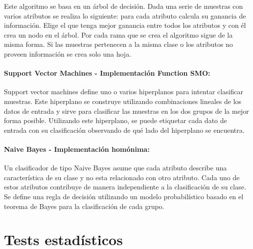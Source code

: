 
Este algoritmo se basa en un árbol de decisión. Dada una serie de muestras con varios atributos se realiza lo siguiente: para cada atributo calcula su ganancia de información. Elige el que tenga mejor ganancia entre todos los atributos y con él crea un nodo en el árbol. Por cada rama que se crea el algoritmo sigue de la misma forma. Si las muestras pertenecen a la misma clase o los atributos no proveen información se crea solo una hoja.

\paragraph{Support Vector Machines \cite{Platt98sequentialminimal} - Implementación Function SMO:}


Support vector machines define uno o varios hiperplanos para intentar clasificar muestras. Este hiperplano se construye utilizando combinaciones lineales de los datos de entrada y sirve para clasificar las muestras en los dos grupos de la mejor forma posible. Utilizando este hiperplano, se puede etiquetar cada dato de entrada con su clasificación observando de qué lado del hiperplano se encuentra.

\paragraph{Naive Bayes \cite{DBLP:conf/flairs/Zhang04} - Implementación homónima:}


Un clasificador de tipo Naive Bayes asume que cada atributo describe una característica de su clase y no esta relacionado con otro atributo. Cada uno de estos atributos contribuye de manera independiente a la clasificación de su clase. Se define una regla de decisión utilizando un modelo probabilístico basado en el teorema de Bayes para la clasificación de cada grupo.

\section{Tests estadísticos}

